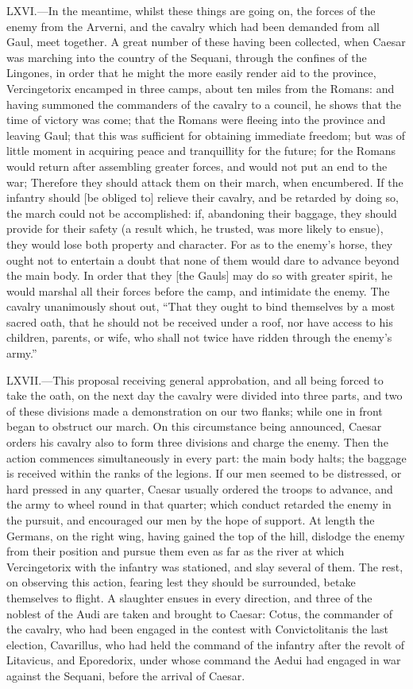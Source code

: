 LXVI.—In the meantime, whilst these things are going on, the forces of
the enemy from the Arverni, and the cavalry which had been demanded from
all Gaul, meet together. A great number of these having been collected,
when Caesar was marching into the country of the Sequani, through the
confines of the Lingones, in order that he might the more easily render
aid to the province, Vercingetorix encamped in three camps, about ten
miles from the Romans: and having summoned the commanders of the cavalry
to a council, he shows that the time of victory was come; that the
Romans were fleeing into the province and leaving Gaul; that this was
sufficient for obtaining immediate freedom; but was of little moment in
acquiring peace and tranquillity for the future; for the Romans would
return after assembling greater forces, and would not put an end to the
war; Therefore they should attack them on their march, when encumbered.
If the infantry should [be obliged to] relieve their cavalry, and be
retarded by doing so, the march could not be accomplished: if,
abandoning their baggage, they should provide for their safety (a result
which, he trusted, was more likely to ensue), they would lose both
property and character. For as to the enemy's horse, they ought not to
entertain a doubt that none of them would dare to advance beyond the
main body. In order that they [the Gauls] may do so with greater spirit,
he would marshal all their forces before the camp, and intimidate the
enemy. The cavalry unanimously shout out, ``That they ought to bind
themselves by a most sacred oath, that he should not be received under a
roof, nor have access to his children, parents, or wife, who shall not
twice have ridden through the enemy's army.''

LXVII.—This proposal receiving general approbation, and all being
forced to take the oath, on the next day the cavalry were divided into
three parts, and two of these divisions made a demonstration on our two
flanks; while one in front began to obstruct our march. On this
circumstance being announced, Caesar orders his cavalry also to form
three divisions and charge the enemy. Then the action commences
simultaneously in every part: the main body halts; the baggage is
received within the ranks of the legions. If our men seemed to be
distressed, or hard pressed in any quarter, Caesar usually ordered the
troops to advance, and the army to wheel round in that quarter; which
conduct retarded the enemy in the pursuit, and encouraged our men by the
hope of support. At length the Germans, on the right wing, having gained
the top of the hill, dislodge the enemy from their position and pursue
them even as far as the river at which Vercingetorix with the infantry
was stationed, and slay several of them. The rest, on observing this
action, fearing lest they should be surrounded, betake themselves to
flight. A slaughter ensues in every direction, and three of the noblest
of the Audi are taken and brought to Caesar: Cotus, the commander of the
cavalry, who had been engaged in the contest with Convictolitanis the
last election, Cavarillus, who had held the command of the infantry
after the revolt of Litavicus, and Eporedorix, under whose command the
Aedui had engaged in war against the Sequani, before the arrival of
Caesar.

